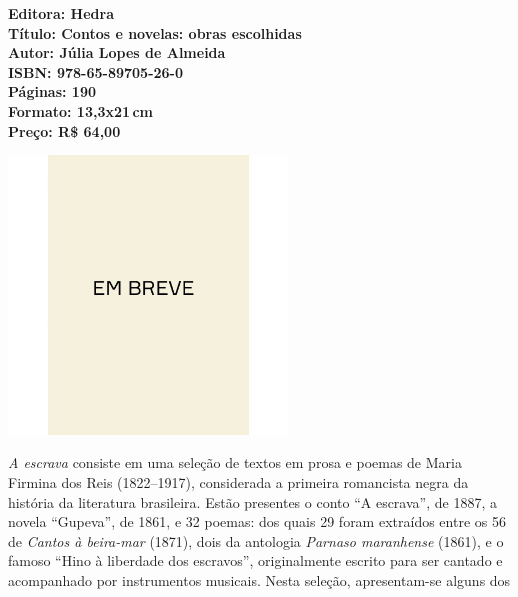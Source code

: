 \vfill
\noindent\begin{minipage}[c]{1\linewidth}
{\small\textbf{
\hspace*{-.1cm}Editora: Hedra\\
Título: Contos e novelas: obras escolhidas\\
Autor: Júlia Lopes de Almeida\\ 
ISBN: 978-65-89705-26-0\\
Páginas: 190\\
Formato: 13,3x21\,cm\\
Preço: R\$ 64,00\\
}}
\end{minipage}
\pagebreak

\begin{center}
\hspace*{-3.6cm}
\hspace*{3.1cm}\includegraphics[width=74mm]{./CAPAS/breve.jpeg}
\end{center}
\hspace*{-7cm}\hrulefill\hspace*{-7cm}
\medskip

\noindent{}\textit{A escrava} consiste em uma seleção de textos em prosa e poemas de Maria Firmina dos Reis (1822–1917), considerada a primeira romancista negra da história da literatura brasileira. Estão presentes o conto ``A escrava'', de 1887, a novela ``Gupeva'', de 1861, e 32 poemas: dos quais 29 foram extraídos entre os 56 de \textit{Cantos à beira-mar} (1871), dois da antologia \textit{Parnaso maranhense} (1861), e o famoso ``Hino à liberdade dos escravos'', originalmente escrito para ser cantado e acompanhado por instrumentos musicais. Nesta seleção, apresentam-se alguns dos 

